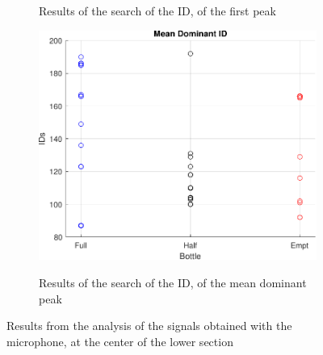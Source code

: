 \begin{figure}[]
\begin{subfigure}{0.45\textwidth}
        \caption{Results of the search of the ID, of the first peak}{}
        \label{subfig:fIDMIC}
    \end{subfigure}
    \begin{subfigure}{0.45\textwidth}
        \centering
        \includegraphics[width=\linewidth]{Chapters/6CHP/Figures/ResultsuCGraphs/MIC/BotMidmID.pdf}
        \caption{Results of the search of the ID, of the mean dominant peak}{}
        \label{subfig:mIDMIC}
    \end{subfigure}
    \caption{Results from the analysis of the signals obtained with the microphone, at the center of the lower section}{}
    \label{fig:MICResAlg}
\end{figure}
